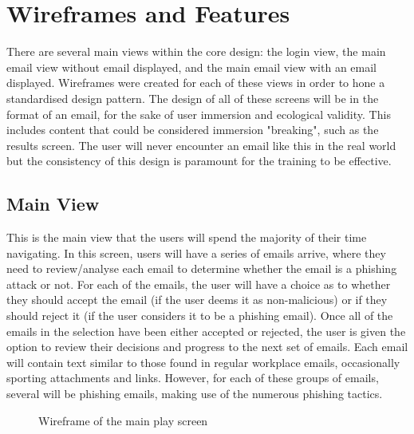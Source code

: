 \documentclass{l4proj}
\begin{document}
\section{Wireframes and Features}
There are several main views within the core design: the login view, the main email view without email displayed, and the main email view with an email displayed. Wireframes were created for each of these views in order to hone a standardised design pattern. The design of all of these screens will be in the format of an email, for the sake of user immersion and ecological validity. This includes content that could be considered immersion "breaking", such as the results screen. The user will never encounter an email like this in the real world but the consistency of this design is paramount for the training to be effective. 


\subsection{Main View}
This is the main view that the users will spend the majority of their time navigating. In this screen, users will have a series of emails arrive, where they need to review/analyse each email to determine whether the email is a phishing attack or not. For each of the emails, the user will have a choice as to whether they should accept the email (if the user deems it as non-malicious) or if they should reject it (if the user considers it to be a phishing email). Once all of the emails in the selection have been either accepted or rejected, the user is given the option to review their decisions and progress to the next set of emails. Each email will contain text similar to those found in regular workplace emails, occasionally sporting attachments and links. However, for each of these groups of emails, several will be phishing emails, making use of the numerous phishing tactics.

\begin{figure}[H]
    \centering
    \caption{Wireframe of the main play screen}
    \label{fig:main_wf} 
\end{figure}
\end{document}
